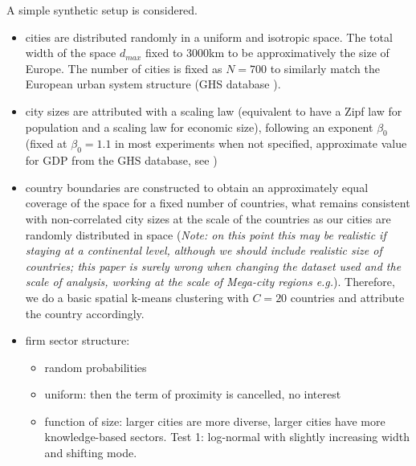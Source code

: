 \documentclass[11pt]{article}
\begin{document}
A simple synthetic setup is considered.
\begin{itemize}
    \item cities are distributed randomly in a uniform and isotropic space. The total width of the space $d_{max}$ fixed to 3000km to be approximatively the size of Europe. The number of cities is fixed as $N=700$ to similarly match the European urban system structure (GHS database \citep{Florczyk2019ghs}).
    \item city sizes are attributed with a scaling law (equivalent to have a Zipf law for population and a scaling law for economic size), following an exponent $\beta_0$ (fixed at $\beta_0 = 1.1$ in most experiments when not specified, approximate value for GDP from the GHS database, see \citep{raimbault:halshs-02284897})
    \item country boundaries are constructed to obtain an approximately equal coverage of the space for a fixed number of countries, what remains consistent with non-correlated city sizes at the scale of the countries as our cities are randomly distributed in space \citep{simini2019testing} (\textit{Note: on this point this may be realistic if staying at a continental level, although we should include realistic size of countries; this paper is surely wrong when changing the dataset used and the scale of analysis, working at the scale of Mega-city regions e.g.}). Therefore, we do a basic spatial k-means clustering with $C = 20$ countries and attribute the country accordingly.
    \item firm sector structure: 
    \begin{itemize}
        \item random probabilities
        \item uniform: then the term of proximity is cancelled, no interest
        \item function of size: larger cities are more diverse, larger cities have more knowledge-based sectors. Test 1: log-normal with slightly increasing width and shifting mode.
    \end{itemize}
\end{itemize}
\end{document}
